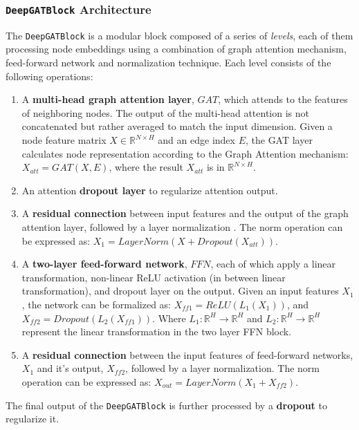 \documentclass[11pt]{article}
\begin{document}
	\subsubsection{\texttt{DeepGATBlock} Architecture}
	The \texttt{DeepGATBlock} is a modular block composed of a series of \textit{levels}, each of them processing node embeddings using a combination of graph attention mechanism, feed-forward network and normalization technique.
	Each level consists of the following operations:
	\begin{enumerate}
		\item A \textbf{multi-head graph attention layer}, $GAT$, which attends to the features of neighboring nodes.
		The output of the multi-head attention is not concatenated but rather averaged to match the input dimension.
		Given a node feature matrix $X \in \mathbb{R}^{N \times H}$ and an edge index $E$, the GAT layer calculates node representation according to the Graph Attention mechanism: $X_{att} = GAT(X, E)$, where the result $X_{att}$ is in $\mathbb{R}^{N \times H}$.
		
		\item An attention \textbf{dropout layer} to regularize attention output.
		
		\item A \textbf{residual connection} between input features and the output of the graph attention layer, followed by a layer normalization \cite{ba2016layernormalization}. The norm operation can be expressed as: $X_1 = LayerNorm(X + Dropout(X_{att}))$.
		
		\item A \textbf{two-layer feed-forward network}, $FFN$, each of which apply a linear transformation, non-linear ReLU activation (in between linear transformation), and dropout layer on the output. Given an input features $X_1$, the network can be formalized as: $X_{ff1} =  ReLU(L_1(X_1))$, and $X_{ff2} = Dropout(L_2(X_{ff1}))$. Where $L_1 : \mathbb{R}^{H} \to \mathbb{R}^{H}$ and $L_2 : \mathbb{R}^{H} \to \mathbb{R}^{H}$ represent the linear transformation in the two layer FFN block.
		
		\item A \textbf{residual connection} between the input features of feed-forward networks, $X_1$ and it's output, $X_{ff2}$, followed by a layer normalization. The norm operation can be expressed as: $X_{out} = LayerNorm(X_1 + X_{ff2})$.
	\end{enumerate}
	The final output of the \texttt{DeepGATBlock} is further processed by a \textbf{dropout} to regularize it.
	
\end{document}
